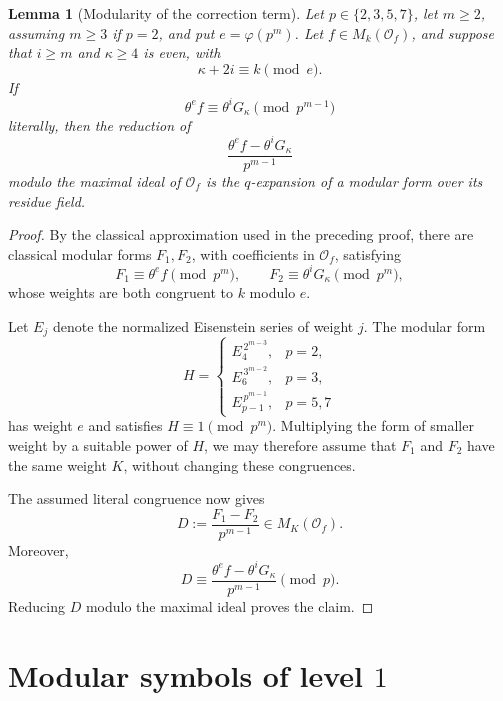 \documentclass[11pt]{article}
\theoremstyle{plain}
\newtheorem{lemma}[theorem]{Lemma}
\theoremstyle{definition}
\theoremstyle{remark}
\numberwithin{equation}{section}
\begin{document}
\begin{lemma}[Modularity of the correction term] \label{lem:modular-correction} Let \(p\in\{2,3,5,7\}\), let \(m\geq2\), assuming \(m\geq3\) if \(p=2\), and put \(e=\varphi(p^m)\). Let \(f\in M_k(\mathcal O_f)\), and suppose that \(i\geq m\) and \(\kappa\geq4\) is even, with \[ \kappa+2i\equiv k\pmod e. \] If \[ \theta^e f\equiv\theta^iG_\kappa\pmod{p^{m-1}} \] literally, then the reduction of \[ \frac{\theta^e f-\theta^iG_\kappa}{p^{m-1}} \] modulo the maximal ideal of \(\mathcal O_f\) is the \(q\)-expansion of a modular form over its residue field. 
\end{lemma}

\begin{proof} By the classical approximation used in the preceding proof, there are classical modular forms \(F_1,F_2\), with coefficients in \(\mathcal O_f\), satisfying \[ F_1\equiv\theta^e f\pmod{p^m}, \qquad F_2\equiv\theta^iG_\kappa\pmod{p^m}, \]whose weights are both congruent to \(k\) modulo \(e\). 

Let \(E_j\) denote the normalized Eisenstein series of weight \(j\). The modular form \[ H= \begin{cases} E_4^{\,2^{m-3}},&p=2,\\ E_6^{\,3^{m-2}},&p=3,\\ E_{p-1}^{\,p^{m-1}},&p=5,7 \end{cases} \] has weight \(e\) and satisfies \(H\equiv1\pmod{p^m}\). Multiplying the form of smaller weight by a suitable power of \(H\), we may therefore assume that \(F_1\) and \(F_2\) have the same weight \(K\), without changing these congruences.

The assumed literal congruence now gives \[ D:=\frac{F_1-F_2}{p^{m-1}}\in M_K(\mathcal O_f). \] Moreover, \[ D\equiv \frac{\theta^e f-\theta^iG_\kappa}{p^{m-1}} \pmod p. \] Reducing \(D\) modulo the maximal ideal proves the claim. 
\end{proof}

\section{Modular symbols of level \texorpdfstring{\(1\)}{1}}
\end{document}
